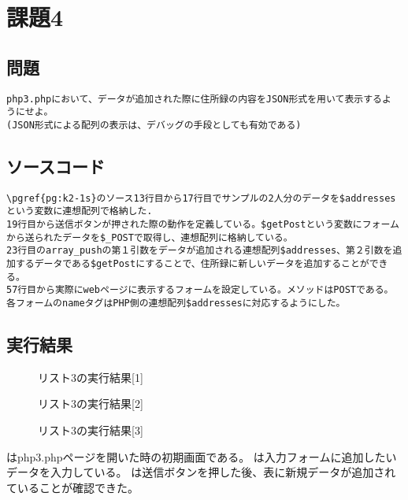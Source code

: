 \documentclass[a4j,10pt]{jsarticle}
\begin{document}
\section{課題4}

\subsection{問題}

\begin{verbatim}
php3.phpにおいて、データが追加された際に住所録の内容をJSON形式を用いて表示するよ
うにせよ。
(JSON形式による配列の表示は、デバッグの手段としても有効である)

\end{verbatim}
\subsection{ソースコード}


\begin{verbatim}
\pgref{pg:k2-1s}のソース13行目から17行目でサンプルの2人分のデータを$addressesという変数に連想配列で格納した.
19行目から送信ボタンが押された際の動作を定義している。$getPostという変数にフォームから送られたデータを$_POSTで取得し、連想配列に格納している。
23行目のarray_pushの第１引数をデータが追加される連想配列$addresses、第２引数を追加するデータである$getPostにすることで、住所録に新しいデータを追加することができる。
57行目から実際にwebページに表示するフォームを設定している。メソッドはPOSTである。
各フォームのnameタグはPHP側の連想配列$addressesに対応するようにした。

\end{verbatim}
\subsection{実行結果}

\begin{figure}[H]
  \centering
  \caption{リスト3の実行結果[1]}
\label{fig:fig3}
\end{figure}

\begin{figure}[H]
  \centering
  \caption{リスト3の実行結果[2]}
\label{fig:fig4}
\end{figure}

\begin{figure}[H]
  \centering
  \caption{リスト3の実行結果[3]}
\label{fig:fig5}
\end{figure}

はphp3.phpページを開いた時の初期画面である。
は入力フォームに追加したいデータを入力している。
は送信ボタンを押した後、表に新規データが追加されていることが確認できた。
\end{document}
